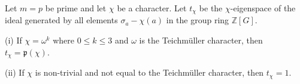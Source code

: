 Let $m = p$ be prime and let $\chi$ be a character. Let $t_{\chi}$ be the $\chi$-eigenspace of the ideal generated by all elements $\sigma_a - \chi(a)$ in the group ring $\mathbb{Z}[G]$.

(i) If $\chi = \omega^k$ where $0 \leq k \leq 3$ and $\omega$ is the Teichmüller character, then $t_{\chi} = \mathfrak{p}(\chi)$.

(ii) If $\chi$ is non-trivial and not equal to the Teichmüller character, then $t_{\chi} = 1$.
